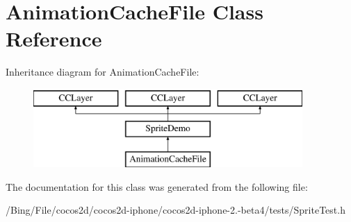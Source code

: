 \hypertarget{interface_animation_cache_file}{\section{Animation\-Cache\-File Class Reference}
\label{interface_animation_cache_file}
}
Inheritance diagram for Animation\-Cache\-File\-:\begin{figure}[H]
\begin{center}
\leavevmode
\includegraphics[height=3.000000cm]{interface_animation_cache_file}
\end{center}
\end{figure}


The documentation for this class was generated from the following file\-:\begin{DoxyCompactItemize}
\item 
/\-Bing/\-File/cocos2d/cocos2d-\/iphone/cocos2d-\/iphone-\/2.-\/beta4/tests/Sprite\-Test.\-h\end{DoxyCompactItemize}

